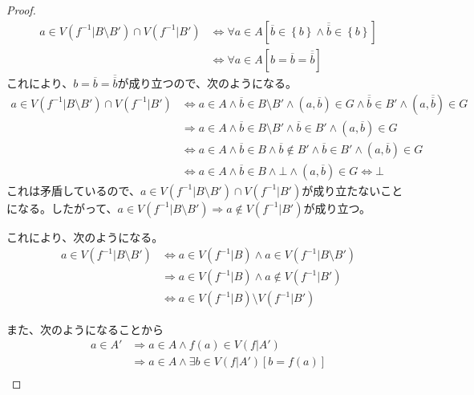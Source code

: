 \documentclass[a4paper]{jsarticle}
\begin{document}
\begin{proof}
\begin{align*}
a \in V\left( f^{- 1}|B \setminus B' \right) \cap V\left( f^{- 1}|B' \right) &\Leftrightarrow \forall a \in A\left[ \overline{b} \in \left\{ b \right\} \land \overline{\overline{b}} \in \left\{ b \right\} \right]\\
&\Leftrightarrow \forall a \in A\left[ b = \overline{b} = \overline{\overline{b}} \right]
\end{align*}
これにより、$b = \overline{b} = \overline{\overline{b}}$が成り立つので、次のようになる。
\begin{align*}
a \in V\left( f^{- 1}|B \setminus B' \right) \cap V\left( f^{- 1}|B' \right) &\Leftrightarrow a \in A \land \overline{b} \in B \setminus B' \land \left( a,\overline{b} \right) \in G \land \overline{\overline{b}} \in B' \land \left( a,\overline{\overline{b}} \right) \in G\\
&\Rightarrow a \in A \land \overline{b} \in B \setminus B' \land \overline{b} \in B' \land \left( a,\overline{b} \right) \in G\\
&\Leftrightarrow a \in A \land \overline{b} \in B \land \overline{b} \notin B' \land \overline{b} \in B' \land \left( a,\overline{b} \right) \in G\\
&\Leftrightarrow a \in A \land \overline{b} \in B \land \bot \land \left( a,\overline{b} \right) \in G \Leftrightarrow \bot
\end{align*}
これは矛盾しているので、$a \in V\left( f^{- 1}|B \setminus B' \right) \cap V\left( f^{- 1}|B' \right)$が成り立たないことになる。したがって、$a \in V\left( f^{- 1}|B \setminus B' \right) \Rightarrow a \notin V\left( f^{- 1}|B' \right)$が成り立つ。\par
これにより、次のようになる。
\begin{align*}
a \in V\left( f^{- 1}|B \setminus B' \right) &\Leftrightarrow a \in V\left( f^{- 1}|B \right) \land a \in V\left( f^{- 1}|B \setminus B' \right)\\
&\Rightarrow a \in V\left( f^{- 1}|B \right) \land a \notin V\left( f^{- 1}|B' \right)\\
&\Leftrightarrow a \in V\left( f^{- 1}|B \right) \setminus V\left( f^{- 1}|B' \right)
\end{align*}\par
また、次のようになることから
\begin{align*}
a \in A' &\Rightarrow a \in A \land f(a) \in V\left( f|A' \right)\\
&\Rightarrow a \in A \land \exists b \in V\left( f|A' \right)\left[ b = f(a) \right]\\

\end{align*}
\end{proof}
\end{document}
